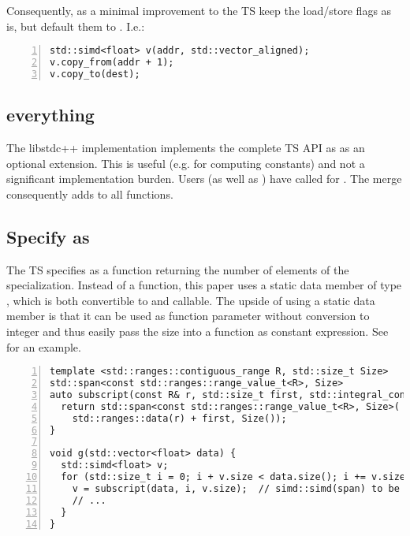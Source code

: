 Consequently, as a minimal improvement to the TS keep the load/store flags as
is, but default them to .
I.e.:
\medskip\begin{lstlisting}[numbers=left]
std::simd<float> v(addr, std::vector_aligned);
v.copy_from(addr + 1);
v.copy_to(dest);
\end{lstlisting}

\subsection{ everything}
The libstdc++ implementation implements the complete TS API as  as an optional extension.
This is useful (e.g. for computing constants) and not a significant implementation burden.
Users (as well as \textcite{P2638R0}) have called for .
The merge consequently adds  to all functions.

\subsection{Specify  as }
The TS specifies  as a  function returning the number of elements of the  specialization.
Instead of a function, this paper uses a static data member of type , which is both convertible to  and callable.
The upside of using a static data member is that it can be used as function parameter without conversion to integer and thus easily pass the size into a function as constant expression.
See  for an example.
\begin{lstlisting}[numbers=left,float={hbtp},label=lst:sizeparam,caption={
    Example: Pass \code{simd::size} as ``constant expression function argument''
}]
template <std::ranges::contiguous_range R, std::size_t Size>
std::span<const std::ranges::range_value_t<R>, Size>
auto subscript(const R& r, std::size_t first, std::integral_constant<std::size_t, Size>) {
  return std::span<const std::ranges::range_value_t<R>, Size>(
    std::ranges::data(r) + first, Size());
}

void g(std::vector<float> data) {
  std::simd<float> v;
  for (std::size_t i = 0; i + v.size < data.size(); i += v.size) {
    v = subscript(data, i, v.size);  // simd::simd(span) to be proposed
    // ...
  }
}
\end{lstlisting}


